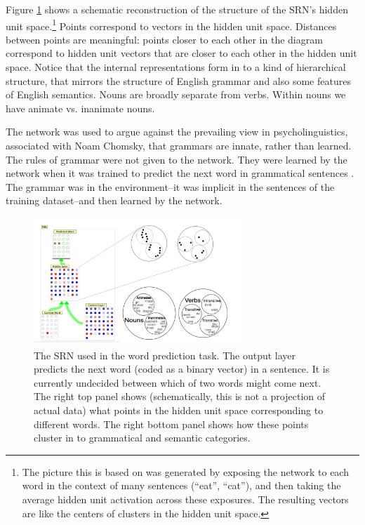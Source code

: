 Figure \ref{srn_words} shows a schematic reconstruction of the structure of the SRN's hidden unit space.\footnote{The picture this is based on was generated by exposing the network to each word in the context of many sentences (\eg ``eat'', ``cat''), and then taking the average hidden unit activation across these exposures. The resulting vectors are like the centers of clusters in the hidden unit space.} Points correspond to vectors in the hidden unit space. Distances between points are meaningful: points closer to each other in the diagram correspond to hidden unit vectors that are closer to each other in the hidden unit space. Notice that the internal representations form in to a kind of hierarchical structure, that mirrors the structure of English grammar and also some features of English semantics. Nouns are broadly separate from verbs. Within nouns we have animate vs. inanimate nouns. 

The network was used to argue against the prevailing view in psycholinguistics, associated with Noam Chomsky,  that  grammars are innate, rather than learned. The rules of grammar were not given to the network. They were learned by the network when it was trained to predict the next word in grammatical sentences \cite{elman1990finding}. The grammar was in the environment--it was implicit in the sentences of the training dataset--and then learned by the network.

\begin{figure}[h]
\centering
\includegraphics[width=0.7\textwidth]{images/elmanCategories.png}
\caption[Pamela Payne.]{The SRN used in the word prediction task. The output layer predicts the next word (coded as a binary vector) in a sentence. It is currently undecided between which of two words might come next. The right top panel shows (schematically, this is not a projection of actual data) what points in the hidden unit space corresponding to different words. The right bottom panel shows how these points cluster in to grammatical and semantic categories.}
\label{srn_words}
\end{figure}

